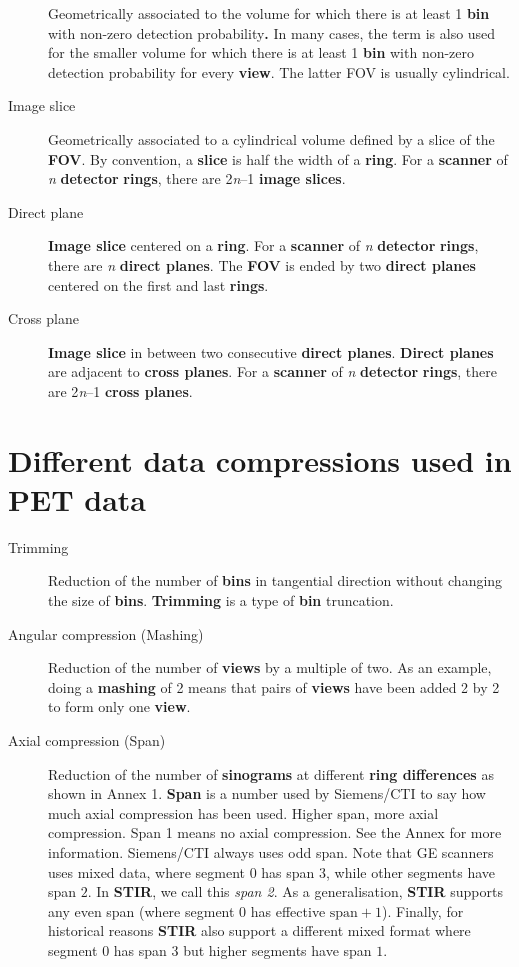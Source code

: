 \documentclass{article}
\begin{document}
\begin{description}
Geometrically associated to the volume for which there is at 
least 1 \textbf{bin} with non-zero detection probability\textbf{.} In many 
cases, the term is also used for the smaller volume for which 
there is at least 1 \textbf{bin} with non-zero detection probability 
for every \textbf{view}. The latter FOV is usually cylindrical.
\item[Image slice] 
Geometrically associated to a cylindrical volume defined by 
a slice of the \textbf{FOV}. By convention, a \textbf{slice} is half the 
width of a \textbf{ring}. For a \textbf{scanner} of \textit{n} \textbf{detector} \textbf{rings}, 
there are 2\textit{n}--1 \textbf{image slices}.
\item[Direct plane] 
\textbf{Image slice} centered on a \textbf{ring}. For a \textbf{scanner} of \textit{n} \textbf{detector} \textbf{rings}, 
there are \textit{n} \textbf{direct planes}. The \textbf{FOV} is ended by two \textbf{direct 
planes} centered on the first and last \textbf{rings}.
\item[Cross plane] 
\textbf{Image slice} in between two consecutive \textbf{direct planes}. \textbf{Direct 
planes} are adjacent to \textbf{cross planes}. For a \textbf{scanner} of \textit{n} \textbf{detector} \textbf{rings}, 
there are 2\textit{n}--1 \textbf{cross planes}.
\end{description}

\section*{Different data compressions used in PET data}
\begin{description}
\item[Trimming] 
Reduction of the number of \textbf{bins} in tangential direction without 
changing the size of \textbf{bins}. \textbf{Trimming} is a type of \textbf{bin} 
truncation.
\item[Angular compression (Mashing)] 
Reduction of the number of \textbf{views} by a multiple of two. As 
an example, doing a \textbf{mashing} of 2 means that pairs of \textbf{views} 
have been added 2 by 2 to form only one \textbf{view}.
\item[Axial compression (Span)] 
Reduction of the number of \textbf{sinograms} at different \textbf{ring 
differences} as shown in Annex 1. \textbf{Span} is a number used by 
Siemens/CTI to say how much axial compression has been used. 
Higher span, more axial compression. Span 1 means 
no axial compression. See the Annex for more information.
Siemens/CTI always uses odd span. 
Note that GE scanners uses mixed data, 
where segment $0$ has span $3$, while other segments have span $2$. 
In \textbf{STIR}, we call this \textit{span 2}. As a generalisation,
\textbf{STIR} supports any even span (where segment $0$ has effective
$\mathrm{span}+1$).
Finally, for historical reasons \textbf{STIR} also support a different mixed
format where segment $0$ has span $3$ but higher segments have span $1$.
\end{description}
\end{document}
